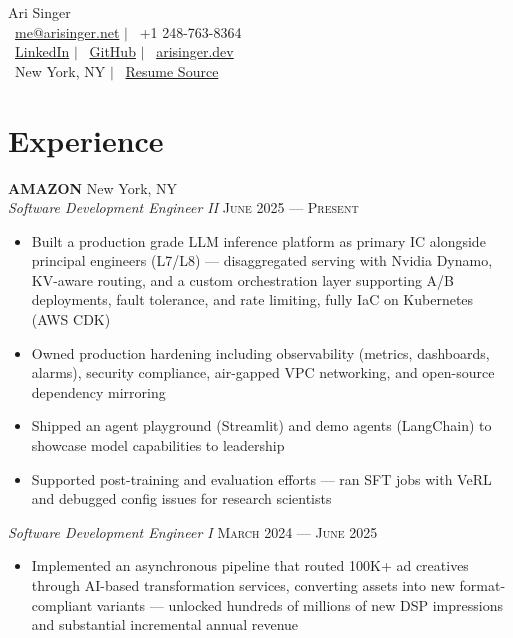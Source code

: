 \documentclass[10pt]{article}
\begin{document}
\color{text1}
\thispagestyle{empty}

{\centering
  {\sffamily\Huge Ari Singer}\\[5pt]
  \faEnvelope\ \href{mailto:me@arisinger.net}{me@arisinger.net}
  \quad $|$ \quad
  \faPhone*\ +1 248-763-8364\\[3pt]
  \faLinkedin\ \href{https://linkedin.com/in/ari-singer}{LinkedIn}
  \quad $|$ \quad
  \faGithub\ \href{https://github.com/ajsinger1}{GitHub}
  \quad $|$ \quad
  \faGlobe\ \href{https://arisinger.dev}{arisinger.dev}
  \\[3pt]
  \faHome\ New York, NY
  \quad $|$ \quad
  \faCode\ \href{https://github.com/ajsinger1/arisinger-resume}{Resume Source}\\[6pt]
}

\section{Experience}

\textbf{AMAZON} \hfill New York, NY\\[1pt]
\textit{Software Development Engineer II} \hfill \textsc{June 2025 --- Present}
\begin{itemize}[leftmargin=*, nosep, topsep=2pt, parsep=1pt]
  \item Built a production grade LLM inference platform as primary IC alongside principal engineers (L7/L8) --- disaggregated serving with Nvidia Dynamo, KV-aware routing, and a custom orchestration layer supporting A/B deployments, fault tolerance, and rate limiting, fully IaC on Kubernetes (AWS CDK)
  \item Owned production hardening including observability (metrics, dashboards, alarms), security compliance, air-gapped VPC networking, and open-source dependency mirroring
  \item Shipped an agent playground (Streamlit) and demo agents (LangChain) to showcase model capabilities to leadership
  \item Supported post-training and evaluation efforts --- ran SFT jobs with VeRL and debugged config issues for research scientists
\end{itemize}

\vspace{1pt}
\textit{Software Development Engineer I} \hfill \textsc{March 2024 --- June 2025}
\begin{itemize}[leftmargin=*, nosep, topsep=2pt, parsep=1pt]
  \item Implemented an asynchronous pipeline that routed 100K+ ad creatives through AI-based transformation services, converting assets into new format-compliant variants --- unlocked hundreds of millions of new DSP impressions and substantial incremental annual revenue
\end{itemize}
\end{document}
